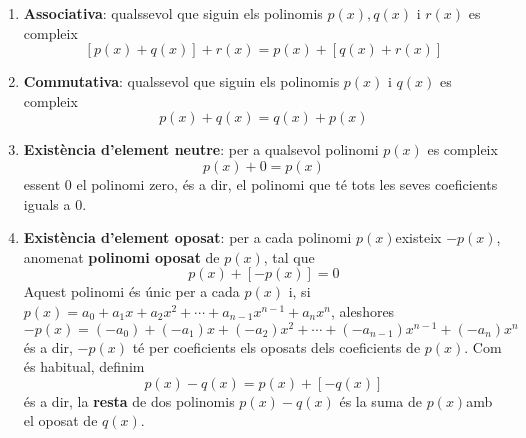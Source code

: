 \begin{enumerate}
\item[(1)] \textbf{Associativa}: qualssevol que siguin els polinomis $p(x),q(x)$ i $r(x)$ es compleix\begin{equation*}
\left[ p(x)+q(x)\right] +r(x)=p(x)+\left[ q(x)+r(x)\right]
\end{equation*}

\item[(2)] \textbf{Commutativa}: qualssevol que siguin els polinomis $p(x)$
i $q(x)$ es compleix\begin{equation*}
p(x)+q(x)=q(x)+p(x)
\end{equation*}

\item[(3)] \textbf{Existència d'element neutre}: per a qualsevol polinomi $p(x)$ es compleix\begin{equation*}
p(x)+0=p(x)
\end{equation*}essent $0$ el polinomi zero, és a dir, el polinomi que té tots les seves
coeficients iguals a $0$.

\item[(4)] \textbf{Existència d'element oposat}: per a cada polinomi $p(x) $existeix $-p(x)$, anomenat \textbf{polinomi oposat} de $p(x)$, tal
que\begin{equation*}
p(x)+\left[ -p(x)\right] =0
\end{equation*}Aquest polinomi és únic per a cada $p(x)$ i, si $p(x)=a_{0}+a_{1}x+a_{2}x^{2}+\cdots +a_{n-1}x^{n-1}+a_{n}x^{n}$, aleshores\begin{equation*}
-p(x)=(-a_{0})+(-a_{1})x+(-a_{2})x^{2}+\cdots
+(-a_{n-1})x^{n-1}+(-a_{n})x^{n}
\end{equation*}és a dir, $-p(x)$ té per coeficients els oposats dels coeficients de
$p(x)$. Com és habitual, definim\begin{equation*}
p(x)-q(x)=p(x)+\left[ -q(x)\right]
\end{equation*}és a dir, la \textbf{resta} de dos polinomis $p(x)-q(x)$ és la suma de $p(x) $amb el oposat de $q(x)$.


\end{enumerate}
